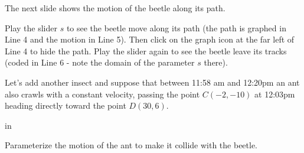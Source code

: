 \documentclass{ximera}
\newcommand{\pskip}{\vskip 0.1 in}
\begin{document}
The next slide shows the motion of the beetle along its path.

\begin{exploration}\label{exp:pc1b}
Play the slider $s$ to see the beetle move along its path (the path is graphed in Line 4 and the motion in Line 5). Then click on the graph icon at the far left of Line 4 to hide the path. Play the slider again to see the beetle leave its tracks (coded in Line 6 - note the domain of the parameter $s$ there).
 
 
\begin{onlineOnly}
    \begin{center}
\end{center}
\end{onlineOnly}
\end{exploration}


Let's add another insect and suppose that between 11:58 am and 12:20pm an ant also crawls with a constant velocity, passing the point $C(-2,-10)$ at 12:03pm heading directly toward the point $D(30,6)$.

\pskip

\begin{example} \label{Ex2}

 Parameterize the motion of the ant to make it collide with the beetle.

\end{example}
\end{document}
